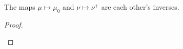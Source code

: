 \documentclass[article, a4paper, 11pt, oneside]{memoir}
\numberwithin{equation}{chapter}
\newcommand{\calB}{\mathcal{B}}
\newcommand{\borel}[1]{\calB(#1)}
\begin{document}
\begin{theorem}
    \label{thm:Radon-pair-inverses}
    The maps $\mu \mapsto \mu_0$ and $\nu \mapsto \nu^+$ are each other's inverses.
\end{theorem}

\begin{proof}
\begin{proofsec}




\end{proofsec}
\end{proof}
\end{document}

